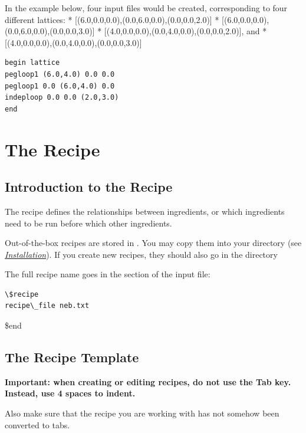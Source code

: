 \documentclass[letterpaper,10pt,english]{sphinxmanual}
\begin{document}
In the example below, four input files would be created, corresponding to four different lattices:
*  {[}(6.0,0.0,0.0),(0.0,6.0,0.0),(0.0,0.0,2.0){]}
*  {[}(6.0,0.0,0.0),(0.0,6.0,0.0),(0.0,0.0,3.0){]}
*  {[}(4.0,0.0,0.0),(0.0,4.0,0.0),(0.0,0.0,2.0){]}, and
*  {[}(4.0,0.0,0.0),(0.0,4.0,0.0),(0.0,0.0,3.0){]}

\begin{Verbatim}[commandchars=\\\{\}]
begin lattice
pegloop1 (6.0,4.0) 0.0 0.0
pegloop1 0.0 (6.0,4.0) 0.0
indeploop 0.0 0.0 (2.0,3.0)
end
\end{Verbatim}


\chapter{The Recipe}
\label{4_0_recipe:the-recipe}\label{4_0_recipe::doc}

\section{Introduction to the Recipe}
\label{4_0_recipe:introduction-to-the-recipe}
The recipe defines the relationships between ingredients, or which ingredients need to be run before which other ingredients.

Out-of-the-box recipes are stored in . You may copy them into your  directory (see {\hyperref[1_0_installation::doc]{\emph{Installation}}}). If you create new recipes, they should also go in the   directory

The full recipe name goes in the  section of the input file:

\begin{Verbatim}[commandchars=\\\{\}]
\$recipe
recipe\_file neb.txt
\end{Verbatim}

\$end


\section{The Recipe Template}
\label{4_0_recipe:the-recipe-template}
\textbf{Important: when creating or editing recipes, do not use the Tab key. Instead, use 4 spaces to indent.}

Also make sure that the recipe you are working with has not somehow been converted to tabs.
\end{document}
